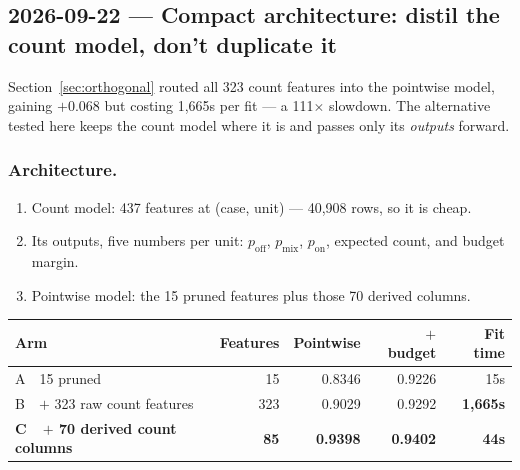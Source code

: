 \subsection{2026-09-22 --- Compact architecture: distil the count model, don't duplicate it}
\label{sec:compact}

Section~\ref{sec:orthogonal} routed all 323 count features into the pointwise model, gaining
$+0.068$ but costing 1{,}665s per fit --- a 111$\times$ slowdown. The alternative tested here keeps
the count model where it is and passes only its \emph{outputs} forward.

\subsubsection*{Architecture.}
\begin{enumerate}\itemsep1pt
  \item Count model: 437 features at (case, unit) --- 40{,}908 rows, so it is cheap.
  \item Its outputs, five numbers per unit: $p_{\text{off}}$, $p_{\text{mix}}$, $p_{\text{on}}$,
        expected count, and budget margin.
  \item Pointwise model: the 15 pruned features plus those 70 derived columns.
\end{enumerate}


\begin{center}
\begin{tabular}{lrrrr}
\toprule
Arm & Features & Pointwise & $+$ budget & Fit time \\
\midrule
A\ \ 15 pruned                    & 15  & 0.8346 & 0.9226 & 15s \\
B\ \ $+$ 323 raw count features   & 323 & 0.9029 & 0.9292 & \textbf{1{,}665s} \\
\textbf{C\ \ $+$ 70 derived count columns} & \textbf{85} & \textbf{0.9398} & \textbf{0.9402} & \textbf{44s} \\
\bottomrule
\end{tabular}
\end{center}


